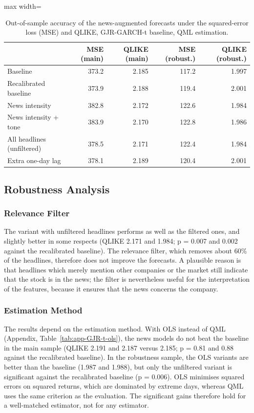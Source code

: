 \documentclass[12pt,a4paper]{article}
\begin{document}
\begin{table}[htbp]
  \centering\small
  \caption[Accuracy of the news models under MSE and QLIKE]{Out-of-sample accuracy of the news-augmented forecasts under the squared-error loss (MSE) and QLIKE, GJR-GARCH-t baseline, QML estimation.}
  \label{tab:mse}
  \begin{adjustbox}{max width=\textwidth}
  \begin{tabular}{lrrrr}
    \toprule
     & MSE (main) & QLIKE (main) & MSE (robust.) & QLIKE (robust.) \\
    \midrule
    Baseline & 373.2 & 2.185 & 117.2 & 1.997 \\
    Recalibrated baseline & 373.9 & 2.188 & 119.4 & 2.001 \\
    News intensity & 382.8 & 2.172 & 122.6 & 1.984 \\
    News intensity + tone & 383.9 & 2.170 & 122.8 & 1.986 \\
    All headlines (unfiltered) & 378.5 & 2.171 & 122.4 & 1.984 \\
    Extra one-day lag & 378.1 & 2.189 & 120.4 & 2.001 \\
    \bottomrule
  \end{tabular}
  \end{adjustbox}
\end{table}

\subsection{Robustness Analysis}\label{sec:results-robustness}
\subsubsection{Relevance Filter}\label{sec:rob-filter}
The variant with unfiltered headlines performs as well as the filtered ones, and slightly better in some respects (QLIKE 2.171 and 1.984; p = 0.007 and 0.002 against the recalibrated baseline). The relevance filter, which removes about 60\% of the headlines, therefore does not improve the forecasts. A plausible reason is that headlines which merely mention other companies or the market still indicate that the stock is in the news; the filter is nevertheless useful for the interpretation of the features, because it ensures that the news concerns the company.

\subsubsection{Estimation Method}\label{sec:rob-ols}
The results depend on the estimation method. With OLS instead of QML (Appendix, Table~\ref{tab:app-GJR-t-ols}), the news models do not beat the baseline in the main sample (QLIKE 2.191 and 2.187 versus 2.185; p = 0.81 and 0.88 against the recalibrated baseline). In the robustness sample, the OLS variants are better than the baseline (1.987 and 1.988), but only the unfiltered variant is significant against the recalibrated baseline (p = 0.006). OLS minimises squared errors on squared returns, which are dominated by extreme days, whereas QML uses the same criterion as the evaluation. The significant gains therefore hold for a well-matched estimator, not for any estimator.
\end{document}
